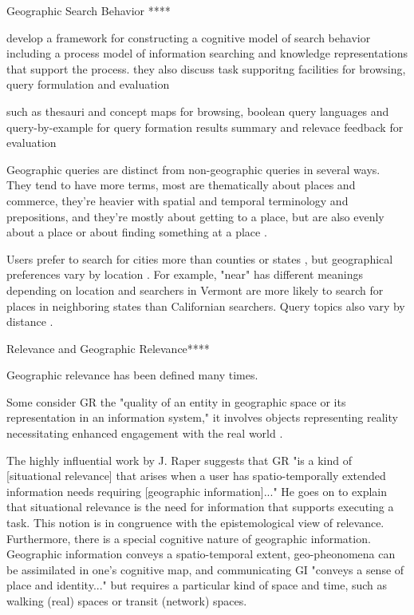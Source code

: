 Geographic Search Behavior ****

develop a framework for constructing a cognitive model of search behavior including a process model of information searching and knowledge representations that support the process.
\cite{Sutcliffe1998}
they also discuss task supporitng facilities for browsing, query formulation and evaluation

such as thesauri and concept maps for browsing, 
boolean query languages and query-by-example for query formation
results summary and relevace feedback for evaluation


Geographic queries are distinct from non-geographic queries in several ways. They tend to have more terms, most are thematically about places and commerce, they're heavier with spatial and temporal terminology and prepositions, and they're mostly about getting to a place, but are also evenly about a place or about finding something at a place \cite{Sanderson2007} \cite{Kohler2003} \cite{Henrich2007}.

Users prefer to search for cities more than counties or states \cite{Hamzei2019a}, but geographical preferences vary by location \cite{Jones2008a}. For example, "near" has different meanings depending on location and searchers in Vermont are more likely to search for places in neighboring states than Californian searchers. Query topics also vary by distance \cite{Xiao2010}.


Relevance and Geographic Relevance****


Geographic relevance has been defined many times.

Some consider GR the "quality of an entity in geographic space or its representation in an information system," it involves objects representing reality necessitating enhanced engagement with the real world \cite{Reichenbacher2011}.

The highly influential work by J. Raper suggests that GR "is a kind of [situational relevance] that arises when a user has spatio-temporally extended information needs requiring [geographic information]..." \cite{Raper2007} He goes on to explain that situational relevance is the need for information that supports executing a task. This notion is in congruence with the epistemological view of relevance. Furthermore, there is a special cognitive nature of geographic information. Geographic information conveys a spatio-temporal extent, geo-pheonomena can be assimilated in one's cognitive map, and communicating GI "conveys a sense of place and identity..." but requires a particular kind of space and time, such as walking (real) spaces or transit (network) spaces.


